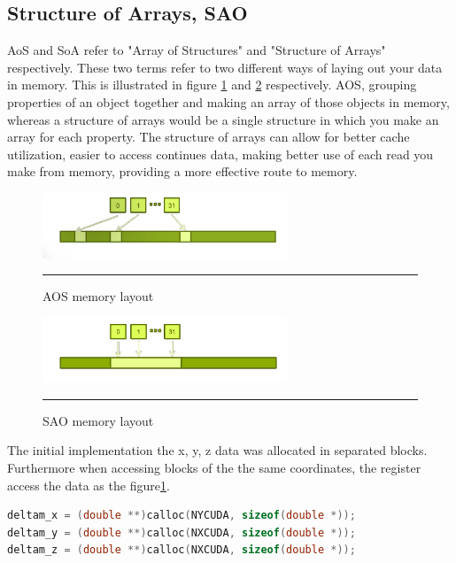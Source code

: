 \subsection{Structure of Arrays, SAO}

AoS and SoA refer to "Array of Structures" and "Structure of Arrays" respectively. These two terms refer to two different ways of laying out your data in memory. This is illustrated in figure \ref{fig:aos} and \ref{fig:sao} respectively. AOS, grouping properties of an object together and making an array of those objects in memory, whereas a structure of arrays would be a single structure in which you make an array for each property. The structure of arrays can allow for better cache utilization, easier to access continues data, making better use of each read you make from memory, providing a more effective route to memory. 

\begin{figure}[htbp]
	\centering
		\includegraphics[width=0.65\textwidth]{Figures/aos.png}
		\rule{35em}{0.2pt}
	\caption[Array of structures (AOS)]{AOS memory layout }
	\label{fig:aos}
\end{figure}


\begin{figure}[htbp]
	\centering
		\includegraphics[width=0.65\textwidth]{Figures/soa.png}
		\rule{35em}{0.2pt}
	\caption[Structure of Arrays (SAO)]{SAO memory layout}
	\label{fig:sao}
\end{figure}


The initial implementation the  x, y, z data was allocated in separated blocks. Furthermore when accessing blocks of the the same coordinates, the register access the data as the figure\ref{fig:aos}.

\begin{lstlisting}[language=C++, caption={AOS implementation}]
deltam_x = (double **)calloc(NYCUDA, sizeof(double *));
deltam_y = (double **)calloc(NXCUDA, sizeof(double *));
deltam_z = (double **)calloc(NXCUDA, sizeof(double *));
\end{lstlisting}

